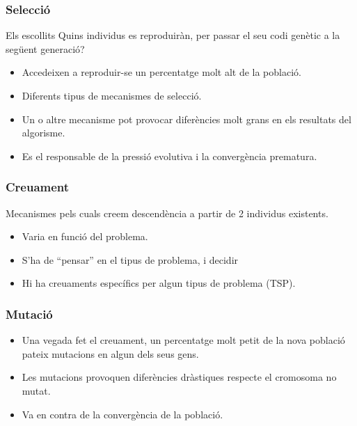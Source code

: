 \documentclass{beamer}
\begin{document}
\begin{frame}
	\frametitle{Selecció}
		\begin{block}{Els escollits}
			Quins individus es reproduiràn, per passar el seu codi genètic a la següent
			generació?
		\end{block}
		\pause
		\begin{itemize}
			\item Accedeixen a reproduir-se un percentatge molt alt de la
			població.
			\item Diferents tipus de mecanismes de selecció.
			\item Un o altre mecanisme pot provocar diferències molt grans en
			els resultats del algorisme.
			\item Es el responsable de la pressió evolutiva i la convergència
			prematura.
		\end{itemize}
\end{frame}


\begin{frame}
	\frametitle{Creuament}
	\begin{block}
		Mecanismes pels cuals creem descendència a partir de 2 individus
		existents.
	\end{block}
		\begin{itemize}
			\item Varia en funció del problema. %
			\item S'ha de ``pensar'' en el tipus de problema, i decidir
			\item Hi ha creuaments específics per algun tipus de problema (TSP).
		\end{itemize}
\end{frame}


\begin{frame}
	\frametitle{Mutació}
		\begin{itemize}
			\item Una vegada fet el creuament, un percentatge molt petit de la nova
			població pateix mutacions en algun dels seus gens.
			\item Les mutacions provoquen diferències dràstiques respecte el
			cromosoma no mutat.
			\item Va en contra de la convergència de la població.
		\end{itemize}
\end{frame}
\end{document}
